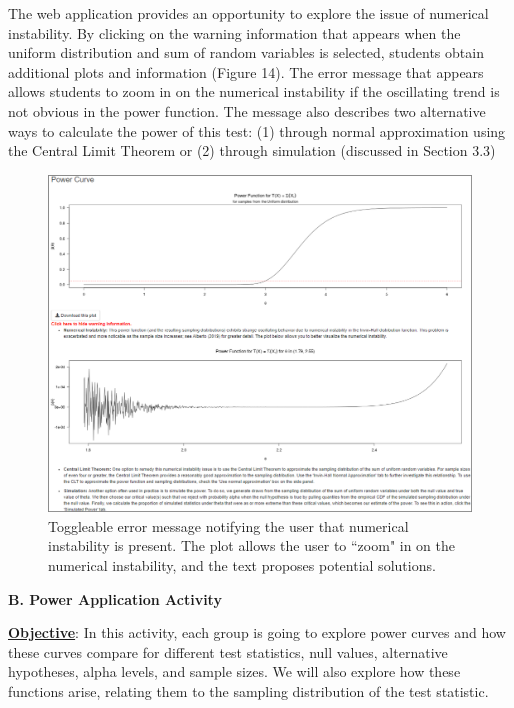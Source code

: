 \documentclass{TISE}
\begin{document}
The web application provides an opportunity to explore the issue of numerical instability. By clicking on the warning information that appears when the uniform distribution and sum of random variables is selected, students obtain additional plots and information (Figure 14). The error message that appears allows students to zoom in on the numerical instability if the oscillating trend is not obvious in the power function. The message also describes two alternative ways to calculate the power of this test: (1) through normal approximation using the Central Limit Theorem or (2) through simulation (discussed in Section 3.3)

\begin{figure}[H]
	\centering
	\includegraphics[width=\textwidth]{fig14.png}
	\caption{Toggleable error message notifying the user that numerical instability is present. The plot allows the user to ``zoom" in on the numerical instability, and the text proposes potential solutions.}
\end{figure}

\newpage

\begin{center}
	\textbf{\large B. Power Application Activity}
\end{center}

\textbf{\underline{Objective}}: In this activity, each group is going to explore power curves and how these curves compare for different test statistics, null values, alternative hypotheses, alpha levels, and sample sizes. We will also explore how these functions arise, relating them to the sampling distribution of the test statistic.
\end{document}
